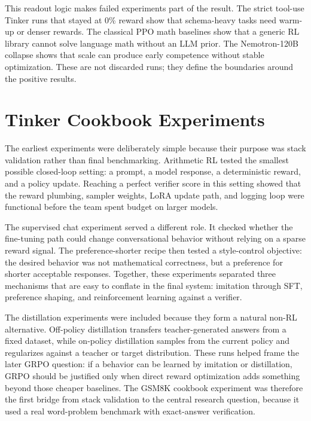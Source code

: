 \documentclass[12pt,a4paper]{report}
\begin{document}
This readout logic makes failed experiments part of the result. The strict tool-use Tinker runs that stayed at 0\% reward show that schema-heavy tasks need warm-up or denser rewards. The classical PPO math baselines show that a generic RL library cannot solve language math without an LLM prior. The Nemotron-120B collapse shows that scale can produce early competence without stable optimization. These are not discarded runs; they define the boundaries around the positive results.

\section{Tinker Cookbook Experiments}
\label{sec:tinker-cookbook}

The earliest experiments were deliberately simple because their purpose was stack validation rather than final benchmarking. Arithmetic RL tested the smallest possible closed-loop setting: a prompt, a model response, a deterministic reward, and a policy update. Reaching a perfect verifier score in this setting showed that the reward plumbing, sampler weights, LoRA update path, and logging loop were functional before the team spent budget on larger models.

The supervised chat experiment served a different role. It checked whether the fine-tuning path could change conversational behavior without relying on a sparse reward signal. The preference-shorter recipe then tested a style-control objective: the desired behavior was not mathematical correctness, but a preference for shorter acceptable responses. Together, these experiments separated three mechanisms that are easy to conflate in the final system: imitation through SFT, preference shaping, and reinforcement learning against a verifier.

The distillation experiments were included because they form a natural non-RL alternative. Off-policy distillation transfers teacher-generated answers from a fixed dataset, while on-policy distillation samples from the current policy and regularizes against a teacher or target distribution. These runs helped frame the later GRPO question: if a behavior can be learned by imitation or distillation, GRPO should be justified only when direct reward optimization adds something beyond those cheaper baselines. The GSM8K cookbook experiment was therefore the first bridge from stack validation to the central research question, because it used a real word-problem benchmark with exact-answer verification.
\end{document}
